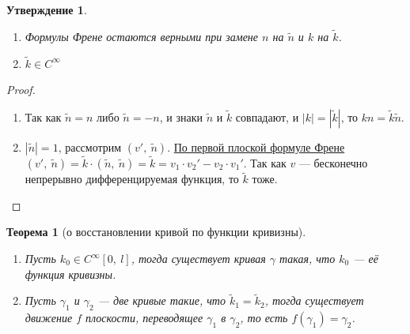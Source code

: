 \documentclass[12pt]{article}
\newcommand\tab[1][.5cm]{\hspace*{#1}}
\theoremstyle{plain}
\newtheorem{theorem}{Теорема}[section]
\newtheorem{subtheorem}{Утверждение}[section]
\begin{document}
    \begin{subtheorem}\tab
        \begin{enumerate}
            \item Формулы Френе остаются верными при замене $n$ на $\tilde{n}$ и $k$ на $\tilde{k}$.
            \item $\tilde{k}\in C^{\infty}$
        \end{enumerate}
    \end{subtheorem}
    \begin{proof}\tab
        \begin{enumerate}
            \item Так как $\tilde{n}=n$ либо $\tilde{n}=-n$, и знаки $\tilde{n}$ и $\tilde{k}$ совпадают, и $|k|=|\tilde{k}|$, то $kn=\tilde{k}\tilde{n}$.
            \item $|\tilde{n}|=1$, рассмотрим $(v', \ \tilde{n})$. \hyperlink{2}{По первой плоской формуле Френе} $(v', \ \tilde{n})=\tilde{k}\cdot(\tilde{n}, \ \tilde{n})=\tilde{k}=v_1\cdot v_2'-v_2\cdot v_1'$. Так как $v$ --- бесконечно непрерывно дифференцируемая функция, то $\tilde{k}$ тоже.
        \end{enumerate}
    \end{proof}
    \begin{theorem}[о восстановлении кривой по функции кривизны]\tab
        \begin{enumerate}
            \item Пусть $k_0\in C^{\infty}[0, \ l]$, тогда существует кривая $\gamma$ такая, что $k_0$ --- её функция кривизны.
            \item Пусть $\gamma_1$ и $\gamma_2$ --- две кривые такие, что $\tilde{k}_1=\tilde{k}_2$, тогда существует движение $f$ плоскости, переводящее $\gamma_1$ в $\gamma_2$, то есть $f(\gamma_1)=\gamma_2$.
        \end{enumerate}
    \end{theorem}
\end{document}
